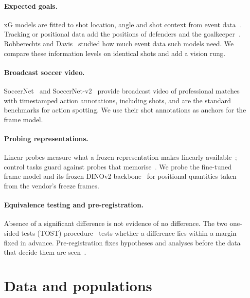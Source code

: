 \documentclass[10pt,twocolumn,letterpaper]{article}
\begin{document}
\paragraph{Expected goals.} xG models are fitted to shot location, angle and shot context from event
data~\cite{rathke2017examination,robberechts2020data}. Tracking or positional data add the positions of defenders
and the goalkeeper~\cite{lucey2015quality,anzer2021goal}. Robberechts and Davis~\cite{robberechts2020data} studied how
much event data such models need. We compare these information levels on identical shots and add a vision rung.

\paragraph{Broadcast soccer video.} SoccerNet~\cite{giancola2018soccernet} and SoccerNet-v2~\cite{deliege2021soccernetv2}
provide broadcast video of professional matches with timestamped action annotations, including shots, and are the
standard benchmarks for action spotting. We use their shot annotations as anchors for the frame model.

\paragraph{Probing representations.} Linear probes measure what a frozen representation makes linearly
available~\cite{alain2017probes}; control tasks guard against probes that memorise~\cite{hewitt2019control}. We probe
the fine-tuned frame model and its frozen DINOv2 backbone~\cite{oquab2024dinov2} for positional quantities taken from
the vendor's freeze frames.

\paragraph{Equivalence testing and pre-registration.} Absence of a significant difference is not evidence of no
difference. The two one-sided tests (TOST) procedure~\cite{schuirmann1987tost,lakens2017equivalence} tests whether a
difference lies within a margin fixed in advance. Pre-registration fixes hypotheses and analyses before the
data that decide them are seen~\cite{nosek2018preregistration}.

\section{Data and populations}
\label{sec:data}
\end{document}
